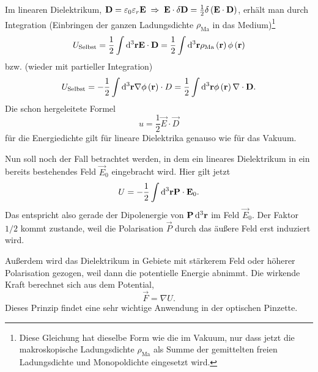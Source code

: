 Im linearen Dielektrikum, $\mathbf{D}=\varepsilon _{0}\varepsilon _{r}\mathbf{E}\;\Rightarrow\; \mathbf{E}\cdot \delta \mathbf{D}=\frac{1}{2}\delta \left(\mathbf{E}\cdot \mathbf{D}\right)$, erhält man durch Integration (Einbringen der ganzen Ladungsdichte $\rho _{\mathrm{Ma}}$ in das Medium)\footnote{Diese Gleichung hat dieselbe Form wie die im Vakuum, nur dass jetzt die makroskopische Ladungsdichte $\rho _{\mathrm{Ma}}$ als Summe der gemittelten freien Ladungsdichte und Monopoldichte eingesetzt wird. }
\begin{equation*}
	U_{\text{Selbst}}=\frac{1}{2}\int \mathop{}\!\mathrm{d} ^{3}\mathbf{r}\mathbf{E}\cdot \mathbf{D}=\frac{1}{2}\int \mathop{}\!\mathrm{d} ^{3}\mathbf{r}\rho _{\mathrm{Ma}}\left(\mathbf{r}\right)\phi \left(\mathbf{r}\right)
\end{equation*}
bzw. (wieder mit partieller Integration)
\begin{equation*}
	U_{\text{Selbst}}=-\frac{1}{2}\int \mathop{}\!\mathrm{d} ^{3}\mathbf{r}\nabla \phi \left(\mathbf{r}\right)\cdot D=\frac{1}{2}\int \mathop{}\!\mathrm{d} ^{3}\mathbf{r}\phi \left(\mathbf{r}\right)\nabla \cdot \mathbf{D}.
\end{equation*}
Die schon hergeleitete Formel
\begin{equation*}
	u=\frac{1}{2}\vec {E}\cdot \vec {D}
\end{equation*}
für die Energiedichte gilt für lineare Dielektrika genauso wie für das Vakuum.

Nun soll noch der Fall betrachtet werden, in dem ein lineares Dielektrikum in ein bereits bestehendes Feld $\vec {E}_{0}$ eingebracht wird. Hier gilt jetzt
\begin{equation*}
	U=-\frac{1}{2}\int \mathop{}\!\mathrm{d} ^{3}\mathbf{r}\mathbf{P}\cdot \mathbf{E}_{0}.
\end{equation*}
Das entspricht also gerade der Dipolenergie von $\mathbf{P}\mathop{}\!\mathrm{d} ^{3}\mathbf{r}$ im Feld $\vec {E}_{0}$. Der Faktor $1/2$ kommt zustande, weil die Polarisation $\vec {P}$ durch das äußere Feld erst induziert wird.

Außerdem wird das Dielektrikum in Gebiete mit stärkerem Feld oder höherer Polarisation gezogen, weil dann die potentielle Energie abnimmt. Die wirkende Kraft berechnet sich aus dem Potential,
\begin{equation*}
	\vec {F}=\nabla U.
\end{equation*}
Dieses Prinzip findet eine sehr wichtige Anwendung in der optischen Pinzette.

